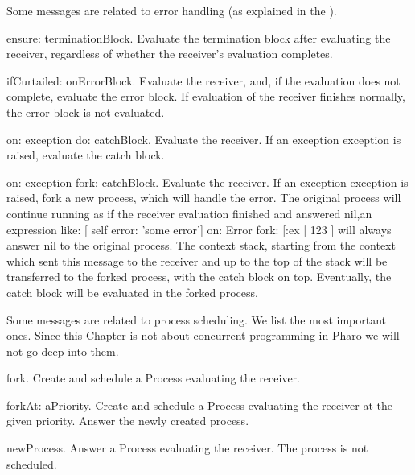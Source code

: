 \documentclass[a4paper,10pt,twoside]{book}
\begin{document}
Some messages are related to error handling (as explained in the ).

\begin{description}
\item{\textsf{ensure: terminationBlock}}. Evaluate the termination block after evaluating the receiver, regardless of whether the receiver's evaluation completes.
\item{\textsf{ifCurtailed: onErrorBlock}}. Evaluate the receiver, and, if the evaluation does not complete, evaluate the error block. If evaluation of the receiver finishes normally, the error block is not evaluated.

\item{\textsf{on: exception do: catchBlock}}. Evaluate the receiver. If an exception \textsf{exception} is raised, evaluate the catch block.

\item{\textsf{on: exception fork: catchBlock}}. Evaluate the receiver. If an exception \textsf{exception} is raised, fork a new process, which will handle the error. The original process will continue running as if the receiver evaluation finished and answered nil,\ie  an expression like: \textsf{[ self error: 'some error'] on: Error fork: [:ex |  123 ]} will always answer nil to the original process. The context stack, starting from the context which sent this message to the receiver and up to the top of the stack will be transferred to the forked process, with the catch block on top. Eventually, the catch block will be evaluated in the forked process.
\end{description}


Some messages are related to process scheduling. We list the most important ones. Since this Chapter is not about concurrent programming in Pharo we will not go deep into them.

\begin{description}
\item{\textsf{fork}}. Create and schedule a Process evaluating the receiver.

\item{\textsf{forkAt: aPriority}}. Create and schedule a Process evaluating the receiver at the given priority. Answer the newly created process.

\item{\textsf{newProcess}}. Answer a Process evaluating the receiver. The process is not scheduled.
\end{description}
\end{document}
